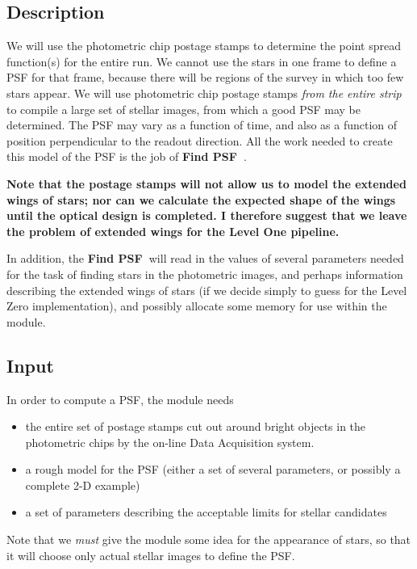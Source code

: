 
\def \fpsf{{\bf Find PSF\ }}
\def \fbs{{\bf Find Bright Stars\ }}

\subsection {Description}

We will use the photometric chip postage stamps to determine the
point spread function(s) for the entire run.  We cannot use the stars in one
frame to define a PSF for that frame, because there will be
regions of the survey in which too few stars appear.
We will use photometric chip postage stamps {\it from the entire strip}
to compile a large set of stellar images, from which a good PSF
may be determined.  The PSF may vary as a function of time, and 
also as a function of position perpendicular to the readout direction.
All the work needed to create this model of the PSF is the job of
\fpsf .

  {\bf Note that the postage stamps will not allow us to 
model the extended wings of stars; nor can we calculate
the expected shape of the wings until the optical design is
completed.  I therefore suggest that we leave the problem of
extended wings for the Level One pipeline.}

  In addition, the \fpsf will read in the values of 
several parameters needed for the task of finding stars in the
photometric images, and perhaps information describing the 
extended wings of stars (if we decide simply to guess for
the Level Zero implementation),
and possibly allocate some memory for 
use within the module.

\subsection {Input}

  In order to compute a PSF, the module needs

\begin{itemize}
  \item the entire set of postage stamps cut out around bright objects
        in the photometric chips by the on-line Data Acquisition system.
  \item a rough model for the PSF (either a set of several parameters,
        or possibly a complete 2-D example)
  \item a set of parameters describing the acceptable limits
        for stellar candidates
\end{itemize}

Note that we {\it must} give the module some idea
for the appearance of stars, so that it will choose only actual
stellar images to define the PSF.


